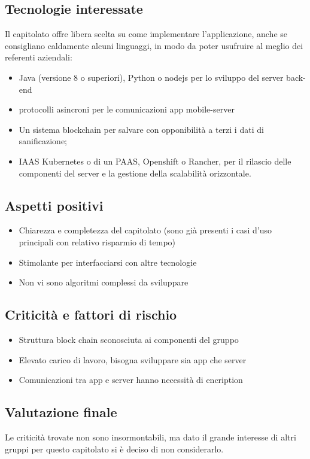 \subsection{Tecnologie interessate}
Il capitolato offre libera scelta su come implementare l'applicazione, anche se consigliano caldamente alcuni linguaggi, in modo da poter usufruire al meglio dei referenti aziendali:
\begin{itemize}
\item Java (versione 8 o superiori), Python o nodejs per lo sviluppo del server back-end
\item protocolli asincroni per le comunicazioni app mobile-server
\item Un sistema blockchain per salvare con opponibilità a terzi i dati di sanificazione;
\item IAAS Kubernetes o di un PAAS, Openshift o Rancher, per il rilascio delle componenti del server e la
gestione della scalabilità orizzontale.
\end{itemize}

\subsection{Aspetti positivi}
\begin{itemize}
\item Chiarezza e completezza del capitolato (sono già presenti i casi d'uso principali con relativo risparmio di tempo)
\item Stimolante per interfacciarsi con altre tecnologie 
\item Non vi sono algoritmi complessi da sviluppare
\end{itemize}

\subsection{Criticità e fattori di rischio}
\begin{itemize}
\item Struttura block chain sconosciuta ai componenti del gruppo 
\item Elevato carico di lavoro, bisogna sviluppare sia app che server
\item Comunicazioni tra app e server hanno necessità di encription
\end{itemize}

\subsection{Valutazione finale}
Le criticità trovate non sono insormontabili, ma dato il grande interesse di altri gruppi per questo capitolato si è deciso di non considerarlo.
